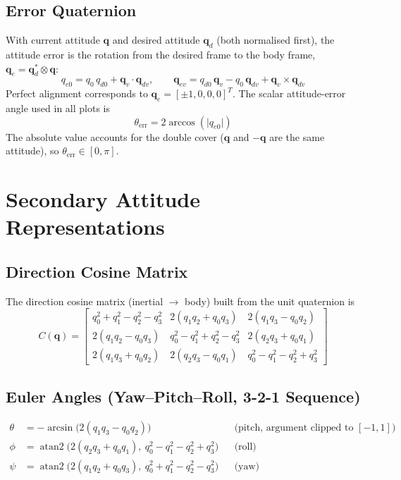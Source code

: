 \documentclass[11pt, a4paper]{article}
\newcommand{\vect}[1]{\boldsymbol{#1}}
\newcommand{\qv}{\vect{q}_v}
\begin{document}
\subsection{Error Quaternion}
With current attitude $\vect{q}$ and desired attitude $\vect{q}_d$ (both normalised first), the attitude error is the rotation from the desired frame to the body frame, $\vect{q}_e = \vect{q}_d^{*} \otimes \vect{q}$:
\begin{equation}
q_{e0} = q_0\, q_{d0} + \qv \cdot \vect{q}_{dv},
\qquad
\vect{q}_{ev} = q_{d0}\,\qv - q_0\,\vect{q}_{dv} + \qv \times \vect{q}_{dv}
\end{equation}
Perfect alignment corresponds to $\vect{q}_e = [\pm 1, 0, 0, 0]^T$. The scalar attitude-error angle used in all plots is
\begin{equation}
\theta_{\text{err}} = 2 \arccos\!\left( \lvert q_{e0} \rvert \right)
\end{equation}
The absolute value accounts for the double cover ($\vect{q}$ and $-\vect{q}$ are the same attitude), so $\theta_{\text{err}} \in [0, \pi]$.

\section{Secondary Attitude Representations}

\subsection{Direction Cosine Matrix}
The direction cosine matrix (inertial $\to$ body) built from the unit quaternion is
\begin{equation}
C(\vect{q}) =
\begin{bmatrix}
q_0^2 + q_1^2 - q_2^2 - q_3^2 & 2(q_1 q_2 + q_0 q_3) & 2(q_1 q_3 - q_0 q_2) \\
2(q_1 q_2 - q_0 q_3) & q_0^2 - q_1^2 + q_2^2 - q_3^2 & 2(q_2 q_3 + q_0 q_1) \\
2(q_1 q_3 + q_0 q_2) & 2(q_2 q_3 - q_0 q_1) & q_0^2 - q_1^2 - q_2^2 + q_3^2
\end{bmatrix}
\end{equation}

\subsection{Euler Angles (Yaw--Pitch--Roll, 3-2-1 Sequence)}
\begin{align}
\theta &= -\arcsin\!\big( 2 (q_1 q_3 - q_0 q_2) \big) && \text{(pitch, argument clipped to } [-1, 1]\text{)} \\
\phi &= \operatorname{atan2}\!\big( 2 (q_2 q_3 + q_0 q_1),\ q_0^2 - q_1^2 - q_2^2 + q_3^2 \big) && \text{(roll)} \\
\psi &= \operatorname{atan2}\!\big( 2 (q_1 q_2 + q_0 q_3),\ q_0^2 + q_1^2 - q_2^2 - q_3^2 \big) && \text{(yaw)}
\end{align}
\end{document}
